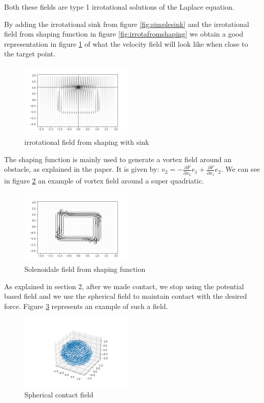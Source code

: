 Both these fields are type 1 irrotational solutions of the Laplace equation.

By adding the irrotational sink from figure \ref{fig:simplesink} and the irrotational field from shaping function in figure \ref{fig:irrotafromshaping} we obtain a good representation in figure \ref{fig:irrotafromshapingwithsink} of what the velocity field will look like when close to the target point. 
\begin{figure}[h!]
    \centering
    \includegraphics[width=0.48\textwidth]{Images/irrotashapingwithsink.png}
    \caption{irrotational field from shaping with sink}
    \label{fig:irrotafromshapingwithsink}
\end{figure}

The shaping function is mainly used to generate a vortex field around an obstacle, as explained in the paper. It is given by: 
$v_2=-\frac{\partial{F}}{\partial{x_2}}e_1 + \frac{\partial{F}}{\partial{x_1}}e_2 $.
We can see in figure \ref{fig:rotafromshaping} an example of vortex field around a super quadriatic.
\begin{figure}[h!]
    \centering
    \includegraphics[width=0.48\textwidth]{Images/rotafromshaping.png}
    \caption{Solenoidale field from shaping function}
    \label{fig:rotafromshaping}
\end{figure}

As explained in section 2, after we made contact, we stop using the potential based field and we use the spherical field to maintain 
contact with the desired force. 
Figure \ref{fig:spherical} represents an example of such a field.
\begin{figure}[h!]
    \centering
    \includegraphics[width=0.48\textwidth]{Images/sphericalfield.png}
    \caption{Spherical contact field}
    \label{fig:spherical}
\end{figure}
